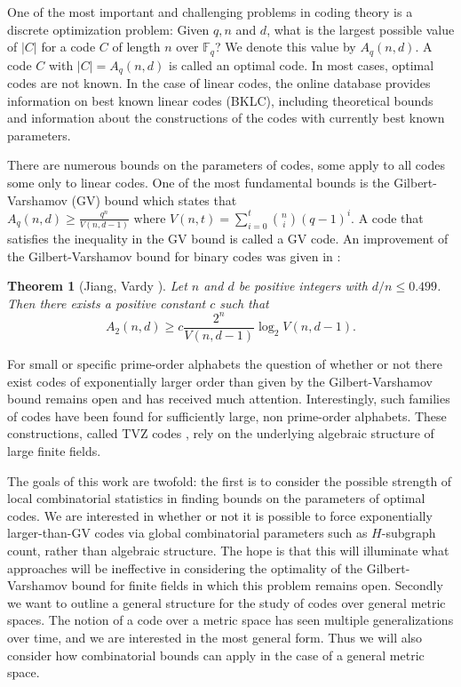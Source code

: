 \documentclass[12pt]{article}
\newtheorem{theorem}{Theorem}
\newcommand{\Fq}{\mathbb{F}_q}
\begin{document}
One of the most important and challenging problems in coding theory is a discrete optimization problem: Given $q,n$ and $d$, what is the largest possible value of $|C|$ for a code $C$ of length $n$ over $\Fq$?  We denote this value by $A_q(n,d)$. A code  $C$ with  $|C|=A_q(n,d)$ is called an optimal code. In most cases, optimal codes are not known. In the case of linear codes, the online database \cite{codetables} provides information on best known linear codes (BKLC), including theoretical bounds and information about the constructions of the codes with currently best known parameters.   


There are numerous bounds on the parameters of codes, some apply to all codes some only to linear codes. One of the most fundamental bounds is the Gilbert-Varshamov (GV) bound   which states that $\displaystyle{A_q(n,d)\geq \frac{q^n}{V(n,d-1)} \text{ where }  V(n,t)=\sum_{i=0}^t \binom{n}{i}(q-1)^i}$. A code that satisfies the inequality in the GV bound is called a GV code. An improvement of  the Gilbert-Varshamov bound for binary codes  was given in \cite{jiang2004}:

\begin{theorem}[Jiang, Vardy \cite{jiang2004}]
\label{thm: Jiang}
    Let $n$ and $d$ be positive integers with $d/n\leq0.499$. Then there exists a positive constant $c$ such that $$A_2(n,d)\geq c\frac{2^n}{V(n,d-1)}\log_2 V(n,d-1).$$
\end{theorem}

For small or specific prime-order alphabets the question of whether or not there exist codes of exponentially larger order than given by the Gilbert-Varshamov bound remains open and has received much attention. Interestingly, such families of codes have been found for sufficiently large, non prime-order alphabets. These constructions, called TVZ codes \cite{tvz1982},  rely on the underlying algebraic structure of large finite fields.

The goals of this work are twofold: the first is to consider the possible strength of local combinatorial statistics in finding bounds on the parameters of optimal codes. We are interested in whether or not it is possible to force exponentially larger-than-GV codes via global combinatorial parameters such as $H$-subgraph count, rather than algebraic structure. The hope is that this will illuminate what approaches will be ineffective in considering the optimality of the Gilbert-Varshamov bound for finite fields in which this problem remains open.
Secondly we want to outline a general structure for the study of codes over general metric spaces. The notion of a code over a metric space has seen multiple generalizations over time, and we are interested in the most general form. Thus we will also consider how combinatorial bounds can apply in the case of a general metric space.
\end{document}
